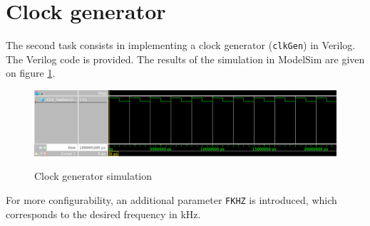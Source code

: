 \section{Clock generator}

The second task consists in implementing a clock generator (\texttt{clkGen}) in Verilog. The Verilog code is provided. The results of the simulation in ModelSim are given on figure \ref{fig:clkGenSimulation}.

\begin{figure}[h]
	\centering
	\includegraphics[scale=0.6]{images/BasicComponents/Task2ClkGenSimulation.png}
	\label{fig:clkGenSimulation}
	\caption{Clock generator simulation}
\end{figure}

For more configurability, an additional parameter \texttt{FKHZ} is introduced, which corresponds to the desired frequency in kHz.